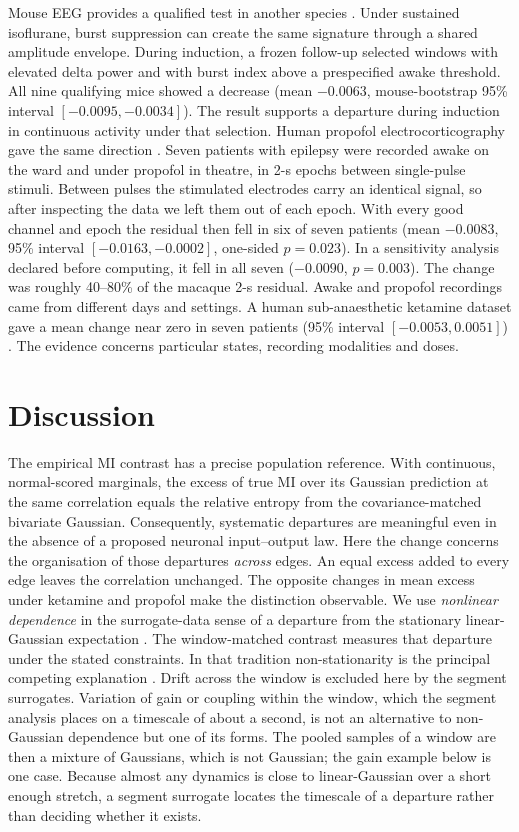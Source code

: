 \documentclass[pdflatex,sn-nature,iicol]{sn-jnl}
\begin{document}
Mouse EEG provides a qualified test in another species \cite{claar2023}. Under sustained isoflurane, burst suppression can create the same signature through a shared amplitude envelope. During induction, a frozen follow-up selected windows with elevated delta power and with burst index above a prespecified awake threshold. All nine qualifying mice showed a decrease (mean $-0.0063$, mouse-bootstrap 95\% interval $[-0.0095,-0.0034]$). The result supports a departure during induction in continuous activity under that selection. Human propofol electrocorticography gave the same direction \cite{vanblooijs2023prios}. Seven patients with epilepsy were recorded awake on the ward and under propofol in theatre, in 2-s epochs between single-pulse stimuli. Between pulses the stimulated electrodes carry an identical signal, so after inspecting the data we left them out of each epoch. With every good channel and epoch the residual then fell in six of seven patients (mean $-0.0083$, 95\% interval $[-0.0163,-0.0002]$, one-sided $p=0.023$). In a sensitivity analysis declared before computing, it fell in all seven ($-0.0090$, $p=0.003$). The change was roughly 40--80\% of the macaque 2-s residual. Awake and propofol recordings came from different days and settings. A human sub-anaesthetic ketamine dataset gave a mean change near zero in seven patients (95\% interval $[-0.0053,0.0051]$) \cite{kauvar2025}. The evidence concerns particular states, recording modalities and doses.



\section{Discussion}

The empirical MI contrast has a precise population reference. With continuous, normal-scored marginals, the excess of true MI over its Gaussian prediction at the same correlation equals the relative entropy from the covariance-matched bivariate Gaussian. Consequently, systematic departures are meaningful even in the absence of a proposed neuronal input--output law. Here the change concerns the organisation of those departures \emph{across} edges. An equal excess added to every edge leaves the correlation unchanged. The opposite changes in mean excess under ketamine and propofol make the distinction observable. We use \emph{nonlinear dependence} in the surrogate-data sense of a departure from the stationary linear-Gaussian expectation \cite{theiler1992testing,schreiber2000surrogate}. The window-matched contrast measures that departure under the stated constraints. In that tradition non-stationarity is the principal competing explanation \cite{schreiber2000surrogate}. Drift across the window is excluded here by the segment surrogates. Variation of gain or coupling within the window, which the segment analysis places on a timescale of about a second, is not an alternative to non-Gaussian dependence but one of its forms. The pooled samples of a window are then a mixture of Gaussians, which is not Gaussian; the gain example below is one case. Because almost any dynamics is close to linear-Gaussian over a short enough stretch, a segment surrogate locates the timescale of a departure rather than deciding whether it exists.
\end{document}
